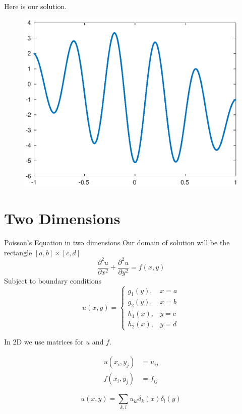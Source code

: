 \documentclass[xcolor={dvipsnames}]{beamer}
\begin{document}
\begin{frame}{Here is our solution.}{}
\begin{figure}
\centering
\includegraphics[width=\linewidth]{Figures/Poisson1D}
\label{fig:Poisson1D}
\end{figure}
\end{frame}




\section{Two Dimensions}

\begin{frame}{Poisson's Equation in two dimensions}{}
Our domain of solution will be the rectangle $[a,b] \times [c,d]$
\begin{equation*}
\frac{\partial^2 u}{\partial x^2}+\frac{\partial^2 u}{\partial y^2}=f(x,y)
\end{equation*}
Subject to boundary conditions 
\begin{equation*}
u(x,y)=\begin{cases}
g_1(y), & x=a\\
g_2(y), & x=b\\
h_1(x), & y=c\\
h_2(x), & y=d
\end{cases}
\end{equation*}

\end{frame}

\begin{frame}{In 2D we use matrices for $u$ and $f$.}{}

\begin{align*}
u(x_i, y_j) &= u_{ij}\\
f(x_i, y_j) &= f_{ij}
\end{align*}

\begin{equation*}
u(x,y)=\sum_{k,l}u_{kl}\delta_k(x)\delta_l(y)
\end{equation*}

\end{frame}
\end{document}
